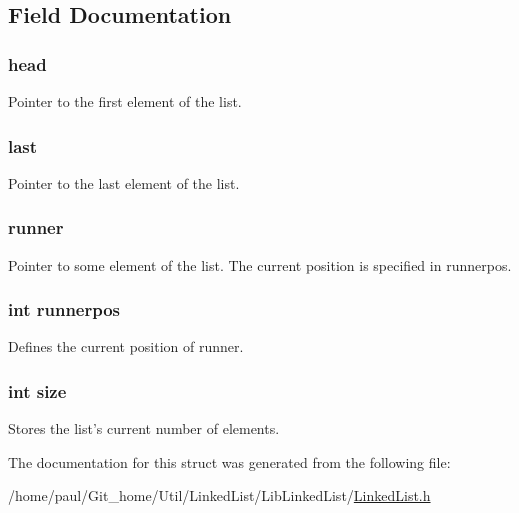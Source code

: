 \subsection{Field Documentation}
\hypertarget{structlinked__list_a164c1f55d34dec4859789a597f4f9b9a}{
\subsubsection[{head}]{ head}}\label{structlinked__list_a164c1f55d34dec4859789a597f4f9b9a}
Pointer to the first element of the list. \hypertarget{structlinked__list_a451377060c58504c44bed6e737005ef1}{
\subsubsection[{last}]{ last}}\label{structlinked__list_a451377060c58504c44bed6e737005ef1}
Pointer to the last element of the list. \hypertarget{structlinked__list_a8f4fa3d6bcc127a8b49fa8379918ee6f}{
\subsubsection[{runner}]{ runner}}\label{structlinked__list_a8f4fa3d6bcc127a8b49fa8379918ee6f}
Pointer to some element of the list. The current position is specified in runnerpos. \hypertarget{structlinked__list_a8f5e1351b3d2db36e169f8a9da02d339}{
\subsubsection[{runnerpos}]{\setlength{\rightskip}{0pt plus 5cm}int runnerpos}}\label{structlinked__list_a8f5e1351b3d2db36e169f8a9da02d339}
Defines the current position of runner. \hypertarget{structlinked__list_a439227feff9d7f55384e8780cfc2eb82}{
\subsubsection[{size}]{\setlength{\rightskip}{0pt plus 5cm}int size}}\label{structlinked__list_a439227feff9d7f55384e8780cfc2eb82}
Stores the list's current number of elements. 

The documentation for this struct was generated from the following file\-:\begin{DoxyCompactItemize}
\item 
/home/paul/\-Git\-\_\-home/\-Util/\-Linked\-List/\-Lib\-Linked\-List/\hyperlink{_linked_list_8h}{Linked\-List.\-h}\end{DoxyCompactItemize}
